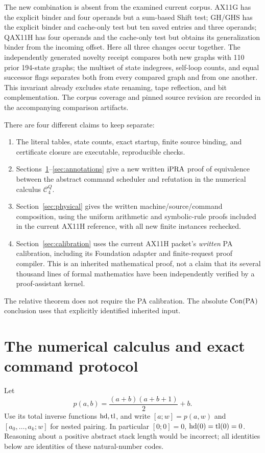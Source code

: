 The new combination is absent from the examined current corpus.
AX11G has the explicit binder and four operands but a sum-based Shift
test; GH/GHS has the explicit binder and cache-only test but ten saved
entries and three operands; QAX11H has four operands and the cache-only
test but obtains its generalization binder from the incoming offset.
Here all three changes occur together. The independently generated
novelty receipt compares both new graphs with 110 prior 194-state
graphs; the multiset of state indegrees, self-loop counts, and equal
successor flags separates both from every compared graph and from one
another. This invariant already excludes state renaming, tape reflection,
and bit complementation. The corpus coverage and pinned source revision
are recorded in the accompanying comparison artifacts.

There are four different claims to keep separate:
\begin{enumerate}
\item The literal tables, state counts, exact startup, finite source
binding, and certificate closure are executable, reproducible checks.
\item Sections~\ref{sec:protocol}--\ref{sec:annotations} give a new written
$\mathrm{iPRA}$ proof of equivalence between the abstract command scheduler and
refutation in the numerical calculus $\mathcal C^Q_4$.
\item Section~\ref{sec:physical} gives the written machine/source/command
composition, using the uniform arithmetic and symbolic-rule proofs
included in the current AX11H reference, with all new finite instances
rechecked.
\item Section~\ref{sec:calibration} uses the current AX11H packet's
\emph{written} PA calibration, including its Foundation adapter and
finite-request proof compiler. This is an inherited mathematical proof,
not a claim that its several thousand lines of formal mathematics have
been independently verified by a proof-assistant kernel.
\end{enumerate}
The relative theorem does not require the PA calibration. The absolute
$\operatorname{Con}(\mathrm{PA})$ conclusion uses that explicitly identified inherited input.

\section{The numerical calculus and exact command protocol}
\label{sec:protocol}

Let
\[
 p(a,b)=\frac{(a+b)(a+b+1)}2+b.
\]
Use its total inverse functions $\operatorname{hd},\operatorname{tl}$, and write
$[a;w]=p(a,w)$ and $[a_0,\ldots,a_k;w]$ for nested pairing.
In particular $[0;0]=0$, $\operatorname{hd}(0)=\operatorname{tl}(0)=0$. Reasoning about a positive
abstract stack length would be incorrect; all identities below are
identities of these natural-number codes.

